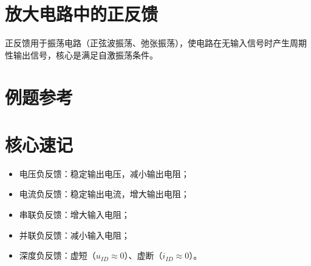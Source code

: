\section{放大电路中的正反馈}
正反馈用于振荡电路（正弦波振荡、弛张振荡），使电路在无输入信号时产生周期性输出信号，核心是满足自激振荡条件。

\section{例题参考}
\section{核心速记}
\begin{itemize}
    \item 电压负反馈：稳定输出电压，减小输出电阻；
    \item 电流负反馈：稳定输出电流，增大输出电阻；
    \item 串联负反馈：增大输入电阻；
    \item 并联负反馈：减小输入电阻；
    \item 深度负反馈：虚短（$u_{ID} \approx 0$）、虚断（$i_{ID} \approx 0$）。
\end{itemize}